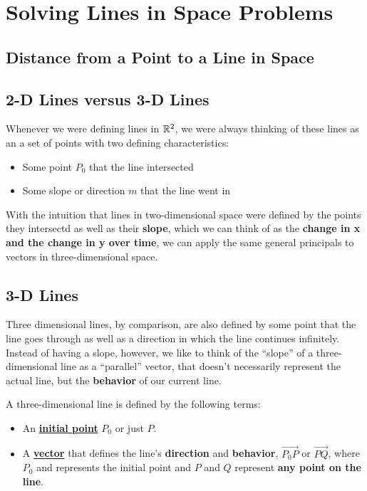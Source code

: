 \documentclass{report}
\begin{document}
\begin{sloppypar}
\section{Solving Lines in Space Problems}
\subsection{Distance from a Point to a Line in Space}
\begin{center}
\end{center}




\subsection{2-D Lines versus 3-D Lines}
Whenever we were defining lines in $ \mathbb{R}^{2}$, we
were always thinking of these lines as an
a set of points with two defining characteristics:
\begin{itemize}
  \item Some point $ P_{0} $ that the line
        intersected
  \item Some slope or direction $ m $ that the
        line went in
\end{itemize}

With the intuition that lines in two-dimensional space
were defined by the points they intersectd as well
as their \textbf{slope}, which we can think of as
the \textbf{change in x and the change in y over time},
we can apply the same general principals to vectors in
three-dimensional space.
\subsection{3-D Lines}
Three dimensional lines, by comparison, are also
defined by some point that the line goes through
as well as a direction in which the line continues
infinitely. Instead of having a slope, however,
we like to think of the ``slope'' of a three-dimensional
line as a ``parallel'' vector, that doesn't necessarily
represent the actual line, but the \textbf{behavior}
of our current line.
\par A three-dimensional line is defined by the following
terms:
\begin{itemize}
  \item An \underline{\textbf{initial point}} $ P_{0} $ or
        just $ P $.
  \item A \underline{\textbf{vector}} that defines
        the line's \textbf{direction} and \textbf{behavior},
        $ \overrightarrow{P_{0}P} $ or $ \overrightarrow{PQ}$, where $ P_{0} $ and
        represents the initial point and $ P $ and $ Q $
        represent \textbf{any point on the line}.


\end{itemize}
\end{sloppypar}
\end{document}
